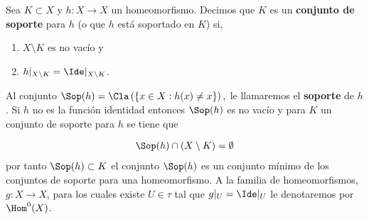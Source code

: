 \begin{df}%
Sea $K \subset X$ y $h:X \to X$ un homeomorfismo. Decimos que $K$ es un  \textbf{ conjunto de soporte} para $h$ (o que $h$ está soportado en $K$) si,

\begin{enumerate}
	\item $X \setminus K$ es no vacío y
	\item $h|_{X \setminus K}=\Ide|_{X \setminus K}$.
\end{enumerate}	
 Al conjunto $ \Sop(h)= \Cla\left( \{x \in X : h(x)\neq x \} \right),$  le llamaremos el \textbf{soporte} de $h$. Si $h$ no es la función identidad entonces $\Sop(h)$ es no vacío y para $K$ un conjunto de soporte para $h$ se tiene que
 
\begin{align*}
     \Sop(h) \cap (X \setminus K) = \emptyset
\end{align*}
 por tanto $\Sop(h) \subset K $ el conjunto $\Sop(h)$ es un conjunto mínimo de los conjuntos de soporte para una homeomorfismo.  A la familia de homeomorfismos, $g:X \to X$, para los cuales existe $U \in \tau$ tal que $g|_U=\Ide|_U$ le denotaremos por $\Hom^0(X)$.
\end{df}
 

